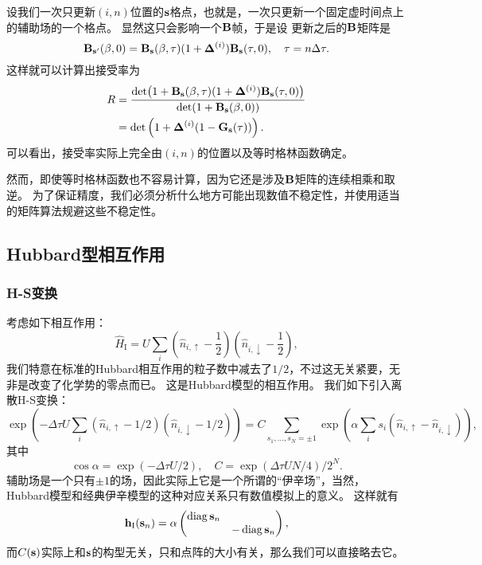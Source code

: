 \documentclass[hyperref, UTF8, a4paper]{ctexart}
\DeclareMathOperator{\diag}{diag}
\begin{document}
设我们一次只更新$(i, n)$位置的$\vb{s}$格点，也就是，一次只更新一个固定虚时间点上的辅助场的一个格点。
显然这只会影响一个$\vb{B}$帧，于是设
更新之后的$\vb{B}$矩阵是
\begin{equation}
    \vb{B}_{\vb{s}'}(\beta, 0) = \vb{B}_{\vb{s}}(\beta, \tau) (1 + \vb{\Delta}^{(i)}) \vb{B}_{\vb{s}}(\tau, 0), \quad \tau = n \Delta \tau.
\end{equation}
这样就可以计算出接受率为
\begin{equation}
    \begin{aligned}
        R &= \frac{\det(1 + \vb{B}_{\vb{s}}(\beta, \tau) (1 + \vb{\Delta}^{(i)}) \vb{B}_{\vb{s}}(\tau, 0))}{\det(1 + \vb{B}_{\vb{s}}(\beta, 0))} \\
        &= \det \left( 1 + \vb{\Delta}^{(i)} (1 - \vb{G}_{\vb{s}}(\tau)) \right).
    \end{aligned}
\end{equation}
可以看出，接受率实际上完全由$(i, n)$的位置以及等时格林函数确定。

然而，即使等时格林函数也不容易计算，因为它还是涉及$\vb{B}$矩阵的连续相乘和取逆。
为了保证精度，我们必须分析什么地方可能出现数值不稳定性，并使用适当的矩阵算法规避这些不稳定性。

\subsection{Hubbard型相互作用}

\subsubsection{H-S变换}

考虑如下相互作用：
\begin{equation}
    \hat{H}_\text{I} = U \sum_i \left(\hat{n}_{i, \uparrow} - \frac{1}{2} \right) \left(\hat{n}_{i, \downarrow} - \frac{1}{2} \right),
\end{equation}
我们特意在标准的Hubbard相互作用的粒子数中减去了$1/2$，不过这无关紧要，无非是改变了化学势的零点而已。
这是Hubbard模型的相互作用。
我们如下引入离散H-S变换：
\begin{equation}
    \exp(-\Delta \tau U \sum_i (\hat{n}_{i, \uparrow} - 1/2) (\hat{n}_{i, \downarrow} - 1/2)) = C \sum_{s_1, \ldots, s_N = \pm 1} \exp(\alpha \sum_i s_i (\hat{n}_{i, \uparrow} - \hat{n}_{i, \downarrow})),
\end{equation}
其中
\begin{equation}
    \cos \alpha = \exp(-\Delta \tau U / 2), \quad C = \exp(\Delta \tau U N / 4) / 2^N.
\end{equation}
辅助场是一个只有$\pm 1$的场，因此实际上它是一个所谓的“伊辛场”，当然，Hubbard模型和经典伊辛模型的这种对应关系只有数值模拟上的意义。
这样就有
\begin{equation}
    \vb{h}_{\text{I}}(\vb{s}_n) = \alpha \pmqty{\dmat{\diag \vb{s}_n, - \diag \vb{s}_n}},
\end{equation}
而$C(\vb{s})$实际上和$\vb{s}$的构型无关，只和点阵的大小有关，那么我们可以直接略去它。
\end{document}
